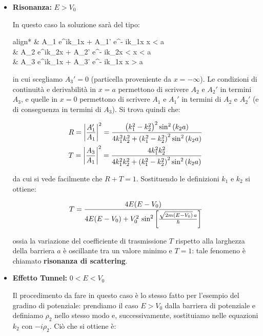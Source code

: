 \begin{itemize}
	\item \textbf{Risonanza:} $E > V_0$
	
		In questo caso la soluzione sarà del tipo:
	
	\begin{empheq}[left={\psi_E\qty(x)=\empheqlbrace}]{align*}
		& A_1 e^{ik_1x} + A_1' e^{- ik_1x} \quad {} \quad x < a \\
		& A_2 e^{ik_2x} + A_2' e^{- ik_2x} \quad {}  < x < a \\
  		& A_3 e^{ik_1x} + A_3' e^{- ik_1x} \quad {} \quad x > a
	\end{empheq}
	
		in cui scegliamo $A_3' = 0$ (particella proveniente da $x = - \infty$). Le condizioni di continuità e derivabilità in $x = a$ permettono di scrivere $A_2$ e $A_2'$ in termini $A_3$, e quelle in $x = 0$ permettono di scrivere $A_1$ e $A_1'$ in termini di $A_2$ e $A_2'$ (e di conseguenza in termini di $A_3$). Si trova quindi che:
		
	\begin{align*}
		& R = \qty|\frac{A_1'}{A_1}|^2 = \frac{\qty(k_1^2 - k_2^2)^2 \sin^2\qty(k_2 a)}{4 k_1^2 k_2^2 + \qty(k_1^2 - k_2^2)^2 \sin^2\qty(k_2 a)} \\
		& T = \qty|\frac{A_3}{A_1}|^2 = \frac{ 4 k_1^2 k_2^2}{4 k_1^2 k_2^2 + \qty(k_1^2 - k_2^2)^2 \sin^2\qty(k_2 a)}
	\end{align*}
	
		da cui si vede facilmente che $R + T = 1$. Sostituendo le definizioni $k_1$ e $k_2$ si ottiene:
		
	\begin{align*}
		T = \frac{4 E \qty(E - V_0)}{4 E \qty(E - V_0) + V_0^2 \, \sin^2\qty[ \frac{\sqrt{2 m \qty(E - V_0)} \, a}{\hbar}]}
	\end{align*}	
	
		ossia la variazione del coefficiente di trasmissione $T$ rispetto alla larghezza della barriera $a$ è oscillante tra un valore minimo e $T = 1$: tale fenomeno è chiamato \textbf{risonanza di scattering}.
	
	\item \textbf{Effetto Tunnel:} $ 0 < E < V_0$
	
		Il procedimento da fare in questo caso è lo stesso fatto per l'esempio del gradino di potenziale: prendiamo il caso $E > V_0$ dalla barriera di potenziale e definiamo $\rho_2$ nello stesso modo e, successivamente, sostituiamo nelle equazioni $k_2$ con $- i \rho_2$. Ciò che si ottiene è:
		

\end{itemize}
